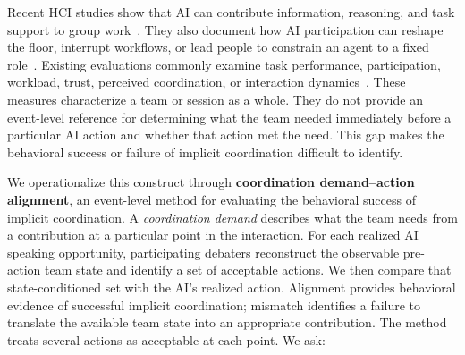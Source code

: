 \documentclass[manuscript,review,anonymous]{acmart}
\begin{document}
Recent HCI studies show that AI can contribute information, reasoning, and task support to group work~\cite{zhang2023teammate, liu2025innerthoughts, zhang2025ladica}. They also document how AI participation can reshape the floor, interrupt workflows, or lead people to constrain an agent to a fixed role~\cite{houde2025controlling, chen2025balanced, mukhopadhyay2026roles, lim2026formation}. Existing evaluations commonly examine task performance, participation, workload, trust, perceived coordination, or interaction dynamics~\cite{zhang2023teammate, ma2025deliberation}. These measures characterize a team or session as a whole. They do not provide an event-level reference for determining what the team needed immediately before a particular AI action and whether that action met the need. This gap makes the behavioral success or failure of implicit coordination difficult to identify.

We operationalize this construct through \textbf{coordination demand--action alignment}, an event-level method for evaluating the behavioral success of implicit coordination. A \emph{coordination demand} describes what the team needs from a contribution at a particular point in the interaction. For each realized AI speaking opportunity, participating debaters reconstruct the observable pre-action team state and identify a set of acceptable actions. We then compare that state-conditioned set with the AI's realized action. Alignment provides behavioral evidence of successful implicit coordination; mismatch identifies a failure to translate the available team state into an appropriate contribution. The method treats several actions as acceptable at each point. We ask:
\end{document}
